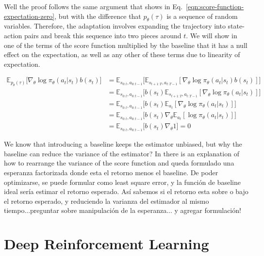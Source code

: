 Well the proof follows the same argument that shows in Eq.~\ref{eqn:score-function-expectation-zero}, but with the difference that 
$p_{\theta}(\tau)$ is a sequence of random variables. Therefore,
the adaptation involves expanding the trajectory into state-action pairs and break this sequence into two pieces around $t$. We will show in one of the
terms  of the score function multiplied by the baseline that it has a null
effect on the expectation, as well as any other of these terms due to linearity of expectation.

\begin{equation}\label{eqn:reinforce-baseline-unbiased}
   \begin{split}
        \mathbb{E}_{p_{\theta}(\tau)}\big[\nabla_{\theta}\log\pi_{\theta}(a_t|s_t) b(s_t) \big] &= \mathbb{E}_{s_{0:t}, a_{0:t-1}}\big[\mathbb{E}_{s_{t+1:T}, a_{t:T-1}}[ \nabla_{\theta}\log \pi_{\theta}(a_{t}|s_{t})b(s_{t})]\big] \\
        &= \mathbb{E}_{s_{0:t}, a_{0:t-1}}\big[b(s_{t})\mathbb{E}_{s_{t+1:T}, a_{t:T-1}}[ \nabla_{\theta}\log \pi_{\theta}(a_{t}|s_{t})]\big] \\
        &= \mathbb{E}_{s_{0:t}, a_{0:t-1}}\big[b(s_{t})\mathbb{E}_{a_{t}}[ \nabla_{\theta}\log \pi_{\theta}(a_{t}|s_{t})]\big] \\
        &= \mathbb{E}_{s_{0:t}, a_{0:t-1}}\big[b(s_{t})\nabla_{\theta}\mathbb{E}_{a_{t}}[\log \pi_{\theta}(a_{t}|s_{t})]\big] \\
        &= \mathbb{E}_{s_{0:t}, a_{0:t-1}}\big[b(s_{t})\nabla_{\theta}1\big] = 0
   \end{split}
\end{equation}

We know that introducing a baseline keeps the estimator unbiased, but why
the baseline can reduce the variance of the estimator? In \cite{seita2017going}
there is an explanation of how to rearrange the variance of the score function and queda formulado una esperanza factorizada donde esta el retorno menos el baseline. De poder optimizarse, se puede formular como least square error, y
la función de baseline ideal sería estimar el retorno esperado. Así sabemos
si el retorno esta sobre o bajo el retorno esperado, y reduciendo la varianza 
del estimador al mismo tiempo...preguntar sobre manipulación de la esperanza...
y agregar formulación!


\section{Deep Reinforcement Learning}


